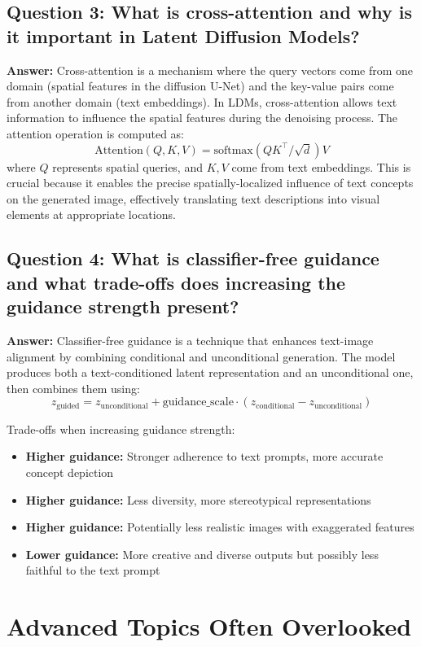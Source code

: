 \subsection*{Question 3: What is cross-attention and why is it important in Latent Diffusion Models?}
\textbf{Answer:} Cross-attention is a mechanism where the query vectors come from one domain (spatial features in the diffusion U-Net) and the key-value pairs come from another domain (text embeddings). In LDMs, cross-attention allows text information to influence the spatial features during the denoising process. The attention operation is computed as:
\[
\text{Attention}(Q, K, V) = \text{softmax}(QK^\top / \sqrt{d})V
\]
where $Q$ represents spatial queries, and $K, V$ come from text embeddings. This is crucial because it enables the precise spatially-localized influence of text concepts on the generated image, effectively translating text descriptions into visual elements at appropriate locations.

\subsection*{Question 4: What is classifier-free guidance and what trade-offs does increasing the guidance strength present?}
\textbf{Answer:} Classifier-free guidance is a technique that enhances text-image alignment by combining conditional and unconditional generation. The model produces both a text-conditioned latent representation and an unconditional one, then combines them using:
\[
z_\text{guided} = z_\text{unconditional} + \text{guidance\_scale} \cdot (z_\text{conditional} - z_\text{unconditional})
\]

Trade-offs when increasing guidance strength:
\begin{itemize}
    \item \textbf{Higher guidance:} Stronger adherence to text prompts, more accurate concept depiction
    \item \textbf{Higher guidance:} Less diversity, more stereotypical representations
    \item \textbf{Higher guidance:} Potentially less realistic images with exaggerated features
    \item \textbf{Lower guidance:} More creative and diverse outputs but possibly less faithful to the text prompt
\end{itemize}
\section{Advanced Topics Often Overlooked}

